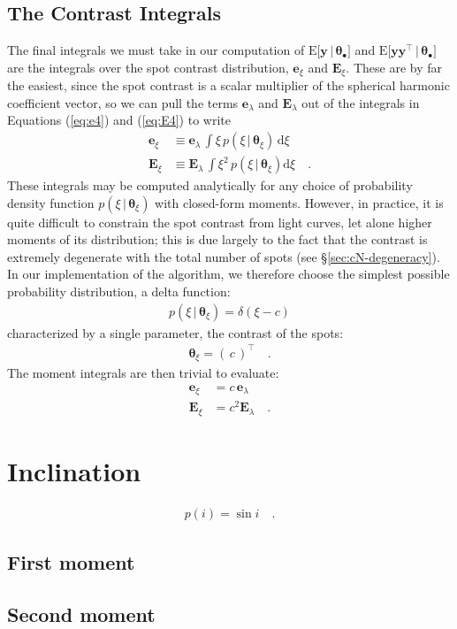 \documentclass[modern]{aastex62}
\begin{document}
\subsection{The Contrast Integrals}
\label{sec:contrast}
%
The final integrals we must take in our computation of
$\mathrm{E} \big[ \mathbf{y} \, \big| \, \pmb{\theta}_\bullet \big]$
and $\mathrm{E} \big[ \mathbf{y} \mathbf{y}^\top \, \big| \, \pmb{\theta}_\bullet \big]$
are the integrals over
the spot contrast distribution, $\mathbf{e}_\xi$ and $\mathbf{E}_\xi$.
These are by far the easiest, since the spot contrast is a scalar
multiplier of the spherical harmonic coefficient vector, so we can
pull the terms $\mathbf{e}_\lambda$ and $\mathbf{E}_\lambda$ out
of the
integrals in Equations (\ref{eq:e4}) and (\ref{eq:E4}) to write
%
\begin{align}
    \mathbf{e}_\xi
     & \equiv
    \mathbf{e}_\lambda \,
    \int
    \xi \,
    p(\xi \, \big| \, \pmb{\theta}_{\xi}) \,
    \mathrm{d}\xi
    \\
    \mathbf{E}_\xi
     & \equiv
    \mathbf{E}_\lambda \,
    \int
    \xi^2 \,
    p(\xi \, \big| \, \pmb{\theta}_\xi)
    \mathrm{d}\xi
    \quad.
\end{align}
%
These integrals may be computed analytically for any choice of
probability density function $p(\xi \, \big| \, \pmb{\theta}_\xi)$
with closed-form moments.
%
However, in practice, it is quite difficult to constrain the
spot contrast from light curves, let alone higher moments of its
distribution; this is due largely to the fact that the contrast
is extremely degenerate with the total number of spots
(see \S\ref{sec:cN-degeneracy}).
%
In our implementation of the algorithm,
we therefore choose the simplest possible probability distribution,
a delta function:
%
\begin{align}
    p(\xi \, \big| \, \pmb{\theta}_{\xi}) = \delta(\xi - c)
\end{align}
%
characterized by a single parameter, the contrast of the spots:
%
\begin{align}
    \pmb{\theta}_\xi = \left( \, c \, \right)^\top
    \quad.
\end{align}
%
The moment integrals are then trivial to evaluate:
%
\begin{align}
    \mathbf{e}_\xi & = c \, \mathbf{e}_\lambda
    \\
    \mathbf{E}_\xi & = c^2 \mathbf{E}_\lambda
    \quad.
\end{align}
%



\section{Inclination}
\label{sec:inclination}

\begin{align}
    p(i) = \sin i
    \quad.
\end{align}

\subsection{First moment}

\subsection{Second moment}




\end{document}
